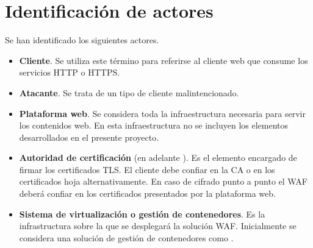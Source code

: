 \section{Identificación de actores}
\par Se han identificado los siguientes actores.
\begin{itemize}
  \item {\bf Cliente}. Se utiliza este término para referirse al cliente web que consume los servicios HTTP o HTTPS.
  \item {\bf \Gls{Atacante}}. Se trata de un tipo de cliente malintencionado.
  \item {\bf Plataforma web}. Se considera toda la infraestructura necesaria para servir los contenidos web. En esta infraestructura no se incluyen los elementos desarrollados en el presente proyecto.
  \item {\bf Autoridad de certificación} (en adelante ). Es el elemento encargado de firmar los certificados TLS. El cliente debe confiar en la CA o en los certificados hoja alternativamente. En caso de cifrado punto a punto el WAF deberá confiar en los certificados presentados por la plataforma web.
  \item {\bf Sistema de virtualización o gestión de contenedores}. Es la infrastructura sobre la que se desplegará la solución WAF. Inicialmente se
    considera una solución de gestión de contenedores como \cite{docker}.
\end{itemize}

